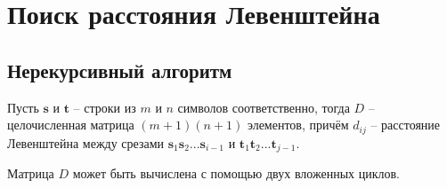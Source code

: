 \documentclass{report}
\begin{document}
\section{Поиск расстояния Левенштейна}

\subsection{Нерекурсивный алгоритм} \label{design-vl-iterative}

Пусть $\textbf{s}$ и $\textbf{t}$ -- строки из $m$ и $n$ символов
соответственно, тогда $D$ -- целочисленная матрица $(m + 1)(n + 1)$
элементов, причём $d_{ij}$ -- расстояние Левенштейна между срезами
$\textbf{s}_1 \textbf{s}_2 ... \textbf{s}_{i - 1}$ и
$\textbf{t}_1 \textbf{t}_2 ... \textbf{t}_{j - 1}$.

Матрица $D$ может быть вычислена с помощью двух вложенных циклов.
\end{document}
